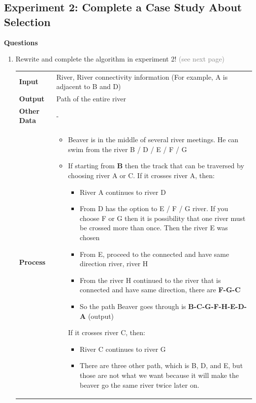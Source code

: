 \documentclass[12pt,titlepage]{article}
\newcommand{\details}[2]{
#1 & #2  \\
}
\begin{document}
\subsection{Experiment 2: Complete a Case Study About Selection}
\textbf{Questions}
\begin{enumerate}
    \item {
        Rewrite and complete the algorithm in experiment 2! \textcolor{gray}{(see next page)}

        \begin{tabularx}{\textwidth}[t]{@{}>{\bfseries}l!{:}X}
        \details{Input}{River, River connectivity information (For example, A is adjacent to B and D)}
        \details{Output}{Path of the entire river}
        \details{Other Data}{-}
        \details{Process}{
            \begin{itemize}
                \item Beaver is in the middle of several river meetings. He can swim from the river B / D / E / F / G
                \item {
                    If starting from \textbf{B} then the track that can be traversed by choosing river A or C.
                    If it crosses river A, then:
                    \begin{itemize}
                        \item River A continues to river D
                        \item From D has the option to E / F / G river. If you choose F or G then it is possibility that one river must be crossed more than once.
                            Then the river E was chosen
                        \item From E, proceed to the connected and have same direction river, river H
                        \item From the river H continued to the river that is connected and have same direction,
                            there are \textbf{F-G-C}
                        \item So the path Beaver goes through is \textbf{B-C-G-F-H-E-D-A} (output)
                    \end{itemize}
                    If it crosses river C, then:
                    \begin{itemize}
                        \item River C continues to river G
                        \item There are three other path, which is B, D, and E, but those are not what we want because it will make the beaver go the same river twice later on.

\end{itemize}}
\end{itemize}}
\end{tabularx}}
\end{enumerate}
\end{document}
